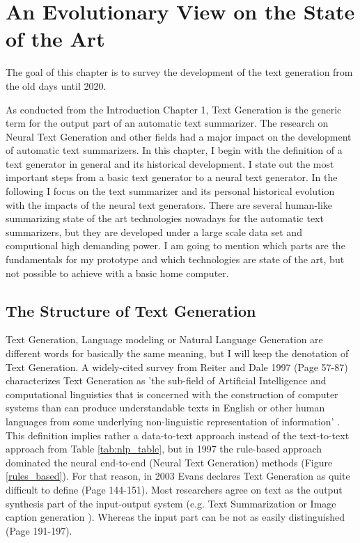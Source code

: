 \chapter{An Evolutionary View on the State of the Art}\label{ch:sota}

The goal of this chapter is to survey the development of the text generation from the old days until 2020. 

As conducted from the Introduction Chapter 1, Text Generation is the generic term for the output part of an automatic text summarizer. The research on Neural Text Generation and other fields had a major impact on the development of automatic text summarizers. In this chapter, I begin with the definition of a text generator in general and its historical development. I state out the most important steps from a basic text generator to a neural text generator. In the following I focus on the text summarizer and its personal historical evolution with the impacts of the neural text generators. There are several human-like summarizing state of the art technologies nowadays for the automatic text summarizers, but they are developed under a large scale data set and computional high demanding power. I am going to mention which parts are the fundamentals for my prototype and which technologies are state of the art, but not possible to achieve with a basic home computer.

\section{The Structure of Text Generation }\label{ss:history}

Text Generation, Language modeling or Natural Language Generation are different words for basically the same meaning, but I will keep the denotation of Text Generation. A widely-cited survey from Reiter and Dale 1997 (Page 57-87) \cite{reiter} characterizes Text Generation as 'the sub-field of Artificial Intelligence and computational linguistics that is concerned with the construction of computer systems than can produce understandable texts in English or other human languages from some underlying non-linguistic representation of information' \cite{reiter}. This definition implies rather a data-to-text approach instead of the text-to-text approach from Table \ref{tab:nlp_table}, but in 1997 the rule-based approach dominated the neural end-to-end (Neural Text Generation) methods (Figure \ref{rules_based}). For that reason, in 2003 Evans declares Text Generation as quite difficult to define \cite{evans} (Page 144-151). Most researchers agree on text as the output synthesis part of the input-output system (e.g. Text Summarization or Image caption generation \cite{mitchell}). Whereas the input part can be not as easily distinguished \cite{mcdonald} (Page 191-197).

